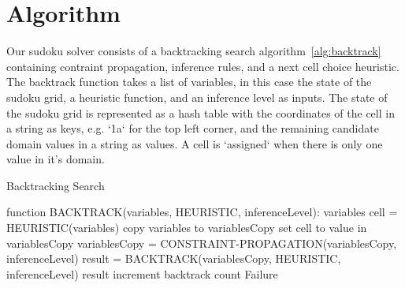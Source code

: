 
\section{Algorithm}

Our sudoku solver consists of a backtracking search algorithm~\ref{alg:backtrack} containing contraint propagation, inference rules, and a next cell choice heuristic. 
The backtrack function takes a list of variables, in this case the state of the sudoku grid, a heuristic function, and an inference level as inputs.
The state of the sudoku grid is represented as a hash table with the coordinates of the cell in a string as keys, e.g. `1a` for the top left corner, and the remaining candidate domain values in a string as values.
A cell is `assigned` when there is only one value in it's domain. 

\begin{algorithm}[H]
    \caption{Backtracking Search}
    \label{alg:backtrack}   
    \begin{algorithmic}
        \STATE function BACKTRACK(variables, HEURISTIC, inferenceLevel):
            \RETURN variables
        \ENDIF
        \STATE cell = HEURISTIC(variables)
            \STATE copy variables to variablesCopy
            \STATE set cell to value in variablesCopy
            \STATE variablesCopy = CONSTRAINT-PROPAGATION(variablesCopy, inferenceLevel)
                \STATE result = BACKTRACK(variablesCopy, HEURISTIC, inferenceLevel)
                    \RETURN result
                \ENDIF
            \ENDIF
        \ENDFOR
        \STATE increment backtrack count
        \RETURN Failure
    \end{algorithmic}
\end{algorithm}

